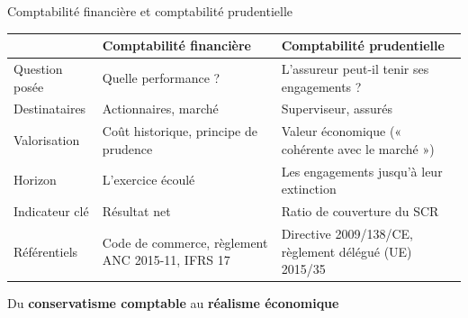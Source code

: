 \documentclass[10pt,aspectratio=169]{beamer}
\begin{document}
\begin{frame}{Comptabilité financière et comptabilité prudentielle}
\begin{table}
\centering
\small
\renewcommand{\arraystretch}{1.4}
\begin{tabular}{p{3.2cm}p{4.8cm}p{4.8cm}}
\toprule
 & \textbf{Comptabilité financière} & \textbf{Comptabilité prudentielle} \\
\midrule
Question posée & Quelle performance ? & L'assureur peut-il tenir ses engagements ? \\
Destinataires & Actionnaires, marché & Superviseur, assurés \\
Valorisation & Coût historique, principe de prudence & Valeur économique (« cohérente avec le marché ») \\
Horizon & L'exercice écoulé & Les engagements jusqu'à leur extinction \\
Indicateur clé & Résultat net & Ratio de couverture du SCR \\
Référentiels & Code de commerce, règlement ANC 2015-11, IFRS 17 & Directive 2009/138/CE, règlement délégué (UE) 2015/35 \\
\bottomrule
\end{tabular}
\end{table}
\begin{center}
\small Du \textbf{conservatisme comptable} au \textbf{réalisme économique}
\end{center}
\end{frame}
\end{document}
